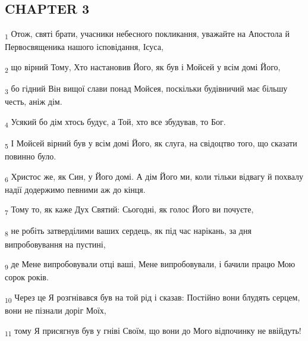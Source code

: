 \subsection{CHAPTER 3}
\begin{tcolorbox}
\textsubscript{1} Отож, святі брати, учасники небесного покликання, уважайте на Апостола й Первосвященика нашого ісповідання, Ісуса,
\end{tcolorbox}
\begin{tcolorbox}
\textsubscript{2} що вірний Тому, Хто настановив Його, як був і Мойсей у всім домі Його,
\end{tcolorbox}
\begin{tcolorbox}
\textsubscript{3} бо гідний Він вищої слави понад Мойсея, поскільки будівничий має більшу честь, аніж дім.
\end{tcolorbox}
\begin{tcolorbox}
\textsubscript{4} Усякий бо дім хтось будує, а Той, хто все збудував, то Бог.
\end{tcolorbox}
\begin{tcolorbox}
\textsubscript{5} І Мойсей вірний був у всім домі Його, як слуга, на свідоцтво того, що сказати повинно було.
\end{tcolorbox}
\begin{tcolorbox}
\textsubscript{6} Христос же, як Син, у Його домі. А дім Його ми, коли тільки відвагу й похвалу надії додержимо певними аж до кінця.
\end{tcolorbox}
\begin{tcolorbox}
\textsubscript{7} Тому то, як каже Дух Святий: Сьогодні, як голос Його ви почуєте,
\end{tcolorbox}
\begin{tcolorbox}
\textsubscript{8} не робіть затверділими ваших сердець, як під час нарікань, за дня випробовування на пустині,
\end{tcolorbox}
\begin{tcolorbox}
\textsubscript{9} де Мене випробовували отці ваші, Мене випробовували, і бачили працю Мою сорок років.
\end{tcolorbox}
\begin{tcolorbox}
\textsubscript{10} Через це Я розгнівався був на той рід і сказав: Постійно вони блудять серцем, вони не пізнали доріг Моїх,
\end{tcolorbox}
\begin{tcolorbox}
\textsubscript{11} тому Я присягнув був у гніві Своїм, що вони до Мого відпочинку не ввійдуть!
\end{tcolorbox}
